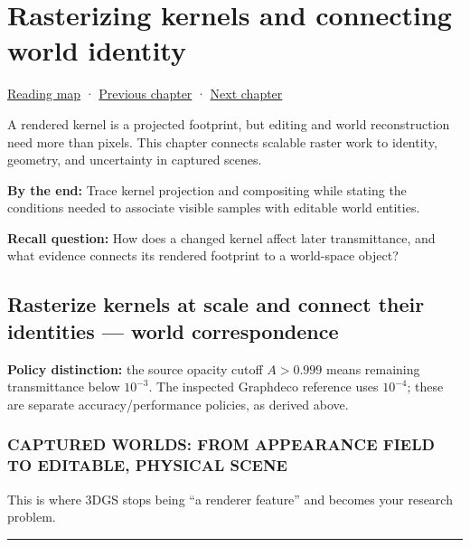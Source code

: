 \hypertarget{06-engine-ii-ch045}{}
\chapter{Rasterizing kernels and connecting world identity}\label{06-engine-ii-ch045-rasterizing-kernels-and-connecting-world-identity}

\hyperref[volume-reading-map]{Reading map} · \hyperref[06-engine-ii-ch044-cross-backend-conversion-and-agreement]{Previous chapter} · \hyperref[06-engine-ii-ch046-game-design-from-mechanics-to-narrative-interfaces]{Next chapter}

A rendered kernel is a projected footprint, but editing and world reconstruction need more than pixels. This chapter connects scalable raster work to identity, geometry, and uncertainty in captured scenes.

\textbf{By the end:} Trace kernel projection and compositing while stating the conditions needed to associate visible samples with editable world entities.

\textbf{Recall question:} How does a changed kernel affect later transmittance, and what evidence connects its rendered footprint to a world-space object?

\section{Rasterize kernels at scale and connect their identities --- world correspondence}\label{06-engine-ii-ch045-rasterize-kernels-at-scale-and-connect-their-identities-world-correspondence}

\textbf{Policy distinction:} the source opacity cutoff \(A>0.999\) means remaining transmittance below \(10^{-3}\). The inspected Graphdeco reference uses \(10^{-4}\); these are separate accuracy/performance policies, as derived above.

\subsection{CAPTURED WORLDS: FROM APPEARANCE FIELD TO EDITABLE, PHYSICAL SCENE}\label{06-engine-ii-ch045-captured-worlds-from-appearance-field-to-editable-physical-scene}

This is where 3DGS stops being ``a renderer feature'' and becomes your research problem.

\begin{center}\rule{0.5\linewidth}{0.5pt}\end{center}

